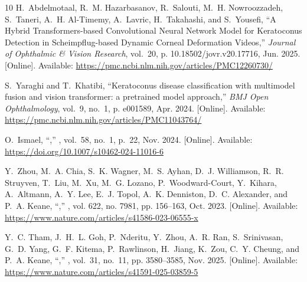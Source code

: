 \begin{thebibliography}{10}
\BIBentryALTinterwordspacing
H.~Abdelmotaal, R.~M. Hazarbasanov, R.~Salouti, M.~H. Nowroozzadeh, S.~Taneri,
  A.~H. Al-Timemy, A.~Lavric, H.~Takahashi, and S.~Yousefi, ``A {Hybrid}
  {Transformers}-based {Convolutional} {Neural} {Network} {Model} for
  {Keratoconus} {Detection} in {Scheimpflug}-based {Dynamic} {Corneal}
  {Deformation} {Videos},'' \emph{Journal of Ophthalmic \& Vision Research},
  vol.~20, p. 10.18502/jovr.v20.17716, Jun. 2025. [Online]. Available:
  \url{https://pmc.ncbi.nlm.nih.gov/articles/PMC12260730/}
\BIBentrySTDinterwordspacing

\BIBentryALTinterwordspacing
S.~Yaraghi and T.~Khatibi, ``Keratoconus disease classification with multimodel
  fusion and vision transformer: a pretrained model approach,'' \emph{BMJ Open
  Ophthalmology}, vol.~9, no.~1, p. e001589, Apr. 2024. [Online]. Available:
  \url{https://pmc.ncbi.nlm.nih.gov/articles/PMC11043764/}
\BIBentrySTDinterwordspacing

\BIBentryALTinterwordspacing
O.~Ismael, ``,''
  \emph{}, vol.~58,
  no.~1, p.~22, Nov. 2024. [Online]. Available:
  \url{https://doi.org/10.1007/s10462-024-11016-6}
\BIBentrySTDinterwordspacing

\BIBentryALTinterwordspacing
Y.~Zhou, M.~A. Chia, S.~K. Wagner, M.~S. Ayhan, D.~J. Williamson, R.~R.
  Struyven, T.~Liu, M.~Xu, M.~G. Lozano, P.~Woodward-Court, Y.~Kihara,
  A.~Altmann, A.~Y. Lee, E.~J. Topol, A.~K. Denniston, D.~C. Alexander, and
  P.~A. Keane, ``,''
  \emph{}, vol. 622, no. 7981, pp. 156--163,
  Oct. 2023. [Online]. Available:
  \url{https://www.nature.com/articles/s41586-023-06555-x}
\BIBentrySTDinterwordspacing

\BIBentryALTinterwordspacing
Y.~C. Tham, J.~H.~L. Goh, P.~Nderitu, Y.~Zhou, A.~R. Ran, S.~Srinivasan, G.~D.
  Yang, G.~F. Kitema, P.~Rawlinson, H.~Jiang, K.~Zou, C.~Y. Cheung, and P.~A.
  Keane, ``,'' \emph{},
  vol.~31, no.~11, pp. 3580--3585, Nov. 2025. [Online]. Available:
  \url{https://www.nature.com/articles/s41591-025-03859-5}
\BIBentrySTDinterwordspacing


\end{thebibliography}
